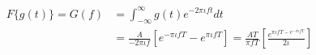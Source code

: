 \documentclass{article}
\begin{document}
	\begin{subequations}
		\begin{align}
			F\{g(t)\} = G(f) &= \int_{-\infty}^{\infty} g(t)e^{-2\pi\iota ft}dt \\
			&= \frac{A}{-2\pi\iota f}[e^{-\pi\iota fT}-e^{\pi\iota fT}] = \frac{AT}{\pi fT}[\frac{e^{\pi\iota fT - e^{-\pi\iota fT}}}{2\iota}]
		\end{align}
	\end{subequations}
\end{document}
